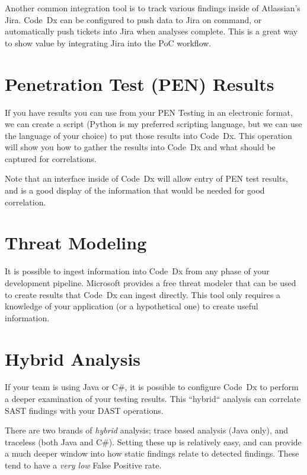 \documentclass[11pt]{article}
\newcommand\codedx{{\color{blue}Code~Dx}\xspace}
\newcommand\MS{Microsoft\texttrademark\xspace}
\newcommand\python{Python\xspace}
\newcommand\java{Java\xspace}
\newcommand\csharp{C\#\xspace}
\begin{document}
Another common integration tool is to track various findings inside of Atlassian's Jira.  \codedx can be
configured to push data to Jira on command, or automatically push tickets into Jira when analyses complete.
This is a great way to show value by integrating Jira into the PoC workflow.

\section{Penetration Test (PEN) Results}

If you have results you can use from your PEN Testing in an electronic format, we can create a script
(\python is my preferred scripting language, but we can use the language of your choice) to put those
results into \codedx.  This operation will show you how to gather the results into \codedx and what should
be captured for correlations.

Note that an interface inside of \codedx will allow entry of PEN test results, and is a good display of
the information that would be needed for good correlation.

\section{Threat Modeling}

It is possible to ingest information into \codedx from any phase of your development pipeline.  \MS
provides a free threat modeler that can be used to create results that \codedx can ingest directly.  This
tool only requires a knowledge of your application (or a hypothetical one) to create useful information.

\section{Hybrid Analysis}

If your team is using \java or \csharp, it is possible to configure \codedx to perform a deeper examination of
your testing results.  This ``hybrid`` analysis can correlate SAST findings with your DAST operations.

There are two brands of \emph{hybrid} analysis; trace based analysis (\java only), and traceless (both
\java and \csharp).  Setting these up is relatively easy, and can provide a much deeper window into how
static findings relate to detected findings.  These tend to have a \emph{very low} {\color{red} False Positive} rate.
\end{document}
